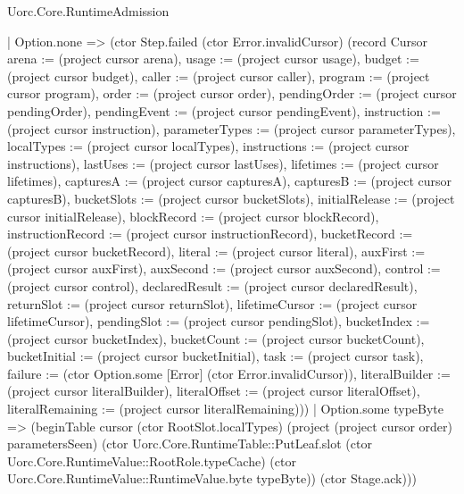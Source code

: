 \begin{lexlean}{Uorc.Core.RuntimeAdmission}
\begin{semanticmodule}
{            | Option.none => (ctor Step.failed (ctor Error.invalidCursor) (record Cursor {arena := (project cursor arena), usage := (project cursor usage), budget := (project cursor budget), caller := (project cursor caller), program := (project cursor program), order := (project cursor order), pendingOrder := (project cursor pendingOrder), pendingEvent := (project cursor pendingEvent), instruction := (project cursor instruction), parameterTypes := (project cursor parameterTypes), localTypes := (project cursor localTypes), instructions := (project cursor instructions), lastUses := (project cursor lastUses), lifetimes := (project cursor lifetimes), capturesA := (project cursor capturesA), capturesB := (project cursor capturesB), bucketSlots := (project cursor bucketSlots), initialRelease := (project cursor initialRelease), blockRecord := (project cursor blockRecord), instructionRecord := (project cursor instructionRecord), bucketRecord := (project cursor bucketRecord), literal := (project cursor literal), auxFirst := (project cursor auxFirst), auxSecond := (project cursor auxSecond), control := (project cursor control), declaredResult := (project cursor declaredResult), returnSlot := (project cursor returnSlot), lifetimeCursor := (project cursor lifetimeCursor), pendingSlot := (project cursor pendingSlot), bucketIndex := (project cursor bucketIndex), bucketCount := (project cursor bucketCount), bucketInitial := (project cursor bucketInitial), task := (project cursor task), failure := (ctor Option.some [Error] (ctor Error.invalidCursor)), literalBuilder := (project cursor literalBuilder), literalOffset := (project cursor literalOffset), literalRemaining := (project cursor literalRemaining)}))
            | Option.some typeByte => (beginTable cursor (ctor RootSlot.localTypes) (project (project cursor order) parametersSeen) (ctor Uorc.Core.RuntimeTable::PutLeaf.slot (ctor Uorc.Core.RuntimeValue::RootRole.typeCache) (ctor Uorc.Core.RuntimeValue::RuntimeValue.byte typeByte)) (ctor Stage.ack)))
}
\end{semanticmodule}
\end{lexlean}
